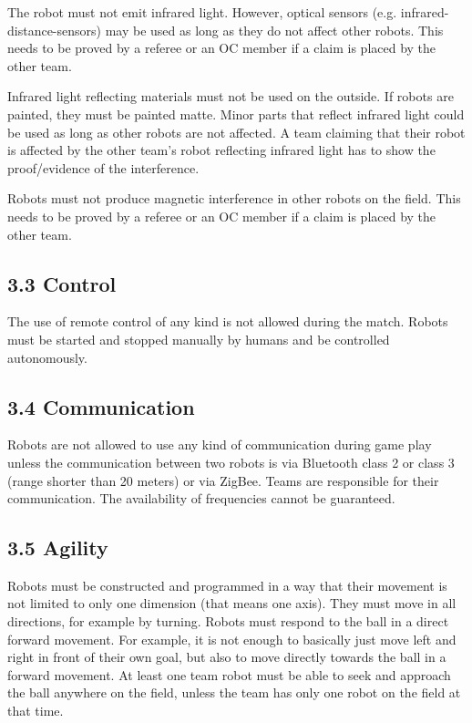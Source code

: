 \documentclass{article}
\begin{document}
The robot must not emit infrared light. However, optical sensors (e.g. infrared-distance-sensors) may be used as long as they do not affect other robots. This needs to be proved by a referee or an OC member if a claim is placed by the other team. 

Infrared light reflecting materials must not be used on the outside. If robots are painted, they must be painted matte. Minor parts that reflect infrared light could be used as long as other robots are not affected. A team claiming that their robot is affected by the other team's robot reflecting infrared light has to show the proof/evidence of the interference.

Robots must not produce magnetic interference in other robots on the field. This needs to be proved by a referee or an OC member if a claim is placed by the other team.

\subsection{3.3 Control \label{ref-021}}

The use of remote control of any kind is not allowed during the match. Robots must be started and stopped manually by humans and be controlled autonomously. 

\subsection{3.4 Communication \label{ref-022}}

Robots are not allowed to use any kind of communication during game play unless the communication between two robots is via Bluetooth class 2 or class 3 (range shorter than 20 meters) or via ZigBee. Teams are responsible for their communication. The availability of frequencies cannot be guaranteed. 

\subsection{3.5 Agility \label{ref-023}}

Robots must be constructed and programmed in a way that their movement is not limited to only one dimension (that means one axis). They must move in all directions, for example by turning. Robots must respond to the ball in a direct forward movement. For example, it is not enough to basically just move left and right in front of their own goal, but also to move directly towards the ball in a forward movement. At least one team robot must be able to seek and approach the ball anywhere on the field, unless the team has only one robot on the field at that time.
\end{document}
